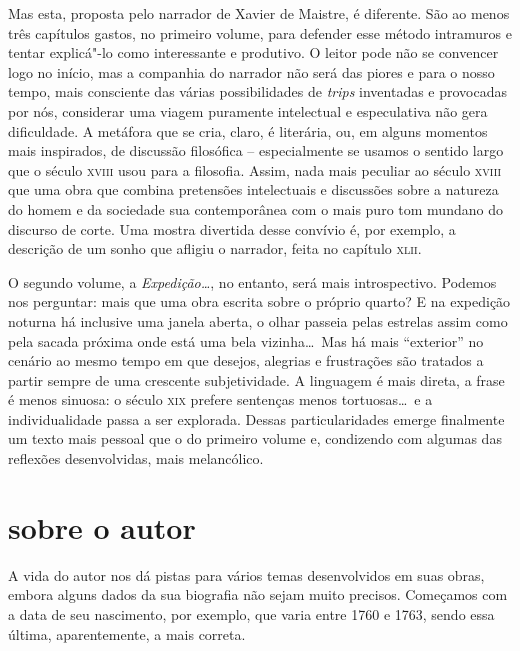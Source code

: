 Mas esta, proposta pelo narrador de Xavier de Maistre, é diferente. São
ao menos três capítulos gastos, no primeiro volume, para defender esse
método intramuros e tentar explicá"-lo como interessante e produtivo. O
leitor pode não se convencer logo no início, mas a companhia do
narrador não será das piores e para o nosso tempo, mais consciente das
várias possibilidades de \textit{trips} inventadas e provocadas por
nós, considerar uma viagem puramente intelectual e especulativa não
gera dificuldade. A metáfora que se cria, claro, é literária, ou, em
alguns momentos mais inspirados, de discussão filosófica --
especialmente se usamos o sentido largo que o século \textsc{xviii} usou para a        %
filosofia. Assim, nada mais peculiar ao século \textsc{xviii} que uma obra que combina
pretensões intelectuais e discussões sobre a natureza do homem e da
sociedade sua contemporânea com o mais puro tom mundano do discurso de                %
corte. Uma mostra divertida desse convívio é, por exemplo, a descrição
de um sonho que afligiu o narrador, feita no capítulo \textsc{xlii}.

 O segundo volume, a \textit{Expedição\ldots}, no entanto, será mais
introspectivo. Podemos nos perguntar: mais que uma obra escrita sobre o
próprio quarto? E na expedição noturna há inclusive uma janela aberta,
o olhar passeia pelas estrelas assim como pela sacada próxima onde está
uma bela vizinha\ldots\ Mas há mais ``exterior'' no cenário ao mesmo tempo em
que desejos, alegrias e frustrações são tratados a partir sempre de uma
crescente subjetividade. A linguagem é mais direta, a frase é menos
sinuosa: o século \textsc{xix} prefere sentenças menos tortuosas\ldots\ e a
individualidade passa a ser explorada. Dessas particularidades emerge
finalmente um texto mais pessoal que o do primeiro volume e, condizendo
com algumas das reflexões desenvolvidas, mais melancólico. 

\section{sobre o autor}

A vida do autor nos dá pistas para vários temas desenvolvidos em suas
obras, embora alguns dados da sua biografia não sejam muito precisos.
Começamos com a data de seu nascimento, por exemplo, que varia entre
1760 e 1763, sendo essa última, aparentemente, a mais correta. 

